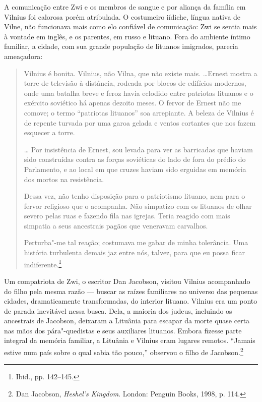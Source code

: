 A comunicação entre Zwi e os membros de sangue e por aliança da família
em Vilnius foi calorosa porém atribulada. O costumeiro iídiche, língua
nativa de Vilne, não funcionava mais como elo confiável de comunicação:
Zwi se sentia mais à vontade em inglês, e os parentes, em russo e
lituano. Fora do ambiente íntimo familiar, a cidade, com sua grande
população de lituanos imigrados, parecia ameaçadora:

\begin{quote}
Vilnius é bonita. Vilnius, não Vilna, que não existe mais.
\ldots{}Ernest mostra a torre de televisão à distância, rodeada por
blocos de edifícios modernos, onde uma batalha breve e feroz havia
eclodido entre patriotas lituanos e o exército soviético há apenas
dezoito meses. O fervor de Ernest não me comove; o termo ``patriotas
lituanos'' soa arrepiante. A beleza de Vilnius é de repente turvada por
uma garoa gelada e ventos cortantes que nos fazem esquecer a torre.

\ldots{} Por insistência de Ernest, sou levada para ver as barricadas
que haviam sido construídas contra as forças soviéticas do lado de fora
do prédio do Parlamento, e ao local em que cruzes haviam sido erguidas
em memória dos mortos na resistência.

Dessa vez, não tenho disposição para o patriotismo lituano, nem para o
fervor religioso que o acompanha. Não simpatizo com os lituanos de olhar
severo pelas ruas e fazendo fila nas igrejas. Teria reagido com mais
simpatia a seus ancestrais pagãos que veneravam carvalhos.

Perturba"-me tal reação; costumava me gabar de minha tolerância. Uma
história turbulenta demais jaz entre nós, talvez, para que eu possa
ficar indiferente.\footnote{Ibid., pp. 142--145.}
\end{quote}

Um compatriota de Zwi, o escritor Dan Jacobson, visitou Vilnius
acompanhado do filho pela mesma razão --- buscar as raízes familiares no
universo das pequenas cidades, dramaticamente transformadas, do interior
lituano. Vilnius era um ponto de parada inevitável nessa busca. Dela, a
maioria dos judeus, incluindo os ancestrais de Jacobson, deixaram a
Lituânia para escapar da morte quase certa nas mãos dos pára"-quedistas
 e seus auxiliares lituanos. Embora fizesse parte integral da memória
familiar, a Lituânia e Vilnius eram lugares remotos. ``Jamais estive num
país sobre o qual sabia tão pouco,'' observou o filho de
Jacobson.\footnote{Dan Jacobson, \emph{Heshel's Kingdom}. London:
  Penguin Books, 1998, p. 114.}

